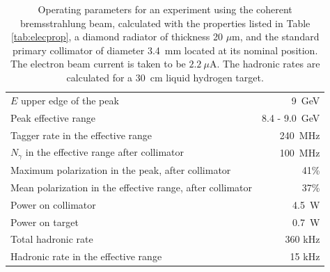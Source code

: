 \begin{table}[ht!]
\begin{center}
\caption[Operating parameters for an experiment]{\label{tab:operates}
Operating parameters for an experiment using the coherent bremsstrahlung beam,
calculated with the properties
listed in Table \ref{tab:elecprop}, a diamond radiator of thickness 20 $\mu$m, and the standard
primary collimator of diameter 3.4~mm located at its nominal position.
The electron beam current is taken to 
be $2.2~\mu$A. The hadronic rates are calculated for 
a 30~cm liquid hydrogen target.}

\begin{tabular}{|l|r|}
\hline\hline
$E$ upper edge of the peak & 9~GeV \\
Peak effective range       & 8.4 - 9.0~GeV\\
Tagger rate in the effective range & 240~MHz  \\
$N_{\gamma}$ in the effective range after collimator & 100~MHz  \\
Maximum polarization in the peak, after collimator & 41\% \\
Mean polarization in the effective range, after collimator & 37\% \\
Power on collimator & 4.5~W \\
Power on target & 0.7~W \\
Total hadronic rate & 360 kHz \\
Hadronic rate in the effective range & 15 kHz \\
\hline\hline
\end{tabular}
\end{center}
\end{table}


